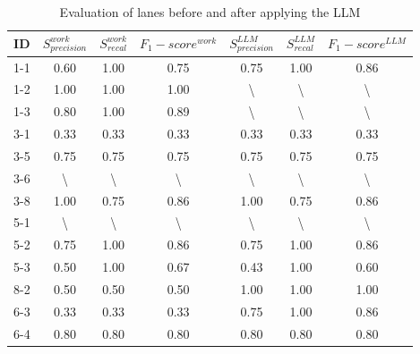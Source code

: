 \begin{table}[]
\caption{\centering Evaluation of lanes before and after applying the LLM}
\label{table:eva_LLM_actor}
\begin{tabular}{|c|c|c|c|c|c|c|}
\hline
\textbf{ID} & $S^{work}_{precision}$      & $S^{work}_{recal}$           & $F_1-score^{work}$        & $S^{LLM}_{precision}$ & $S^{LLM}_{recal}$  &   $F_1-score^{LLM}$    \\ \hline
1-1          & 0.60             & 1.00             & 0.75             & 0.75             & 1.00             & 0.86             \\ \hline
1-2          & 1.00             & 1.00             & 1.00             & \textbackslash{} & \textbackslash{} & \textbackslash{} \\ \hline
1-3          & 0.80             & 1.00             & 0.89             & \textbackslash{} & \textbackslash{} & \textbackslash{} \\ \hline
3-1          & 0.33             & 0.33             & 0.33             & 0.33             & 0.33             & 0.33             \\ \hline
3-5          & 0.75             & 0.75             & 0.75             & 0.75             & 0.75             & 0.75             \\ \hline
3-6          & \textbackslash{} & \textbackslash{} & \textbackslash{} & \textbackslash{} & \textbackslash{} & \textbackslash{} \\ \hline
3-8          & 1.00             & 0.75             & 0.86             & 1.00             & 0.75             & 0.86             \\ \hline
5-1          & \textbackslash{} & \textbackslash{} & \textbackslash{} & \textbackslash{} & \textbackslash{} & \textbackslash{} \\ \hline
5-2          & 0.75             & 1.00             & 0.86             & 0.75             & 1.00             & 0.86             \\ \hline
5-3          & 0.50             & 1.00             & 0.67             & 0.43             & 1.00             & 0.60             \\ \hline
8-2          & 0.50             & 0.50             & 0.50             & 1.00             & 1.00             & 1.00             \\ \hline
6-3          & 0.33             & 0.33             & 0.33             & 0.75             & 1.00             & 0.86             \\ \hline
6-4          & 0.80             & 0.80             & 0.80             & 0.80             & 0.80             & 0.80             \\ \hline

\end{tabular}
\end{table}
